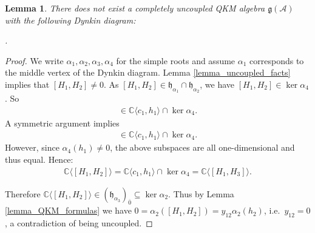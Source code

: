 \documentclass[12pt, a4paper, reqno]{amsart}
\def\C{\mathbb{C}}
\def\h{\mathfrak{h}}
\def\ol{\overline}
\newtheorem{lemma}{Lemma}
\theoremstyle{definition}
\theoremstyle{definition}
\theoremstyle{definition}
\numberwithin{theorem}{section}
\numberwithin{lemma}{section}
\numberwithin{remark}{section}
\numberwithin{definition}{section}
\numberwithin{corollary}{section}
\numberwithin{proposition}{section}
\numberwithin{example}{section}
\begin{document}
	
	\begin{lemma}\label{lemma-Dynkin-D}
		There does not exist a completely uncoupled QKM algebra \(\mathfrak{g}(\mathcal{A})\) with the following Dynkin diagram:
		\begin{center}
			.
		\end{center}
	\end{lemma}
	\begin{proof}
		We write \(\alpha_1,\alpha_2,\alpha_3,\alpha_4\) for the simple roots and assume \(\alpha_1\) corresponds to the middle vertex of the Dynkin diagram.
		Lemma \ref{lemma_uncoupled_facts} implies that \([H_1,H_2] \neq 0\).
		As \([H_1,H_2] \in \h_{\alpha_1}\cap\h_{\alpha_2}\), we have \([H_1,H_2] \in \ker \alpha_4\). So
		\begin{align*}
			[H_1,H_2] \in \C\langle c_1,h_1\rangle\cap\ker\alpha_4.
		\end{align*}
		A symmetric argument implies
		\begin{align*}
			[H_1,H_3] \in\mathbb{C}\langle c_1,h_1 \rangle  \cap \ker \alpha_4.
		\end{align*}
		However, since $\alpha_4(h_1)\neq0$, the above subspaces are all one-dimensional and thus equal.  Hence:  
		\begin{align*}
			\mathbb{C}\langle[H_1,H_2]\rangle = \mathbb{C}\langle c_1,h_1 \rangle \cap \ker \alpha_4 = \mathbb{C}\langle[H_1,H_3]\rangle.
		\end{align*}
		
		Therefore $\mathbb{C}\langle [H_1,H_2] \rangle\in(\h_{\alpha_3})_{\ol{0}}\subseteq\ker\alpha_2$.  Thus by Lemma \ref{lemma_QKM_formulas} we have \newline $0=\alpha_2([H_1,H_2])=y_{12}\alpha_2(h_2)$, i.e.~$y_{12}=0$, a contradiction of being uncoupled.
	\end{proof}
	
\end{document}
